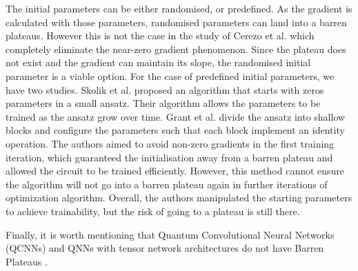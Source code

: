 The initial parameters can be either randomised, or predefined.
As the gradient is calculated with those parameters, randomised parameters can land into a barren plateaus.
However this is not the case in the study of Cerezo et al. which completely eliminate the near-zero gradient phenomenon.
Since the plateau does not exist and the gradient can maintain its slope, the randomised initial parameter is a viable option.
For the case of predefined initial parameters, we have two studies.
Skolik et al. \cite{skolikLayerwiseLearningQuantum2021} proposed an algorithm that starts with zeros parameters in a small ansatz.
Their algorithm allows the parameters to be trained as the ansatz grow over time.
Grant et al. \cite{grantInitializationStrategyAddressing2019} divide the ansatz into shallow blocks and configure the parameters such that each block implement an identity operation.
The authors aimed to avoid non-zero gradients in the first training iteration, which guaranteed the initialisation away from a barren plateau and allowed the circuit to be trained efficiently.
However, this method cannot ensure the algorithm will not go into a barren plateau again in further iterations of optimization algorithm.
Overall, the authors manipulated the starting parameters to achieve trainability, but the risk of going to a plateau is still there.

Finally, it is worth mentioning that Quantum Convolutional Neural Networks (QCNNs) and QNNs with tensor network architectures do not have Barren Plateaus \cite{congQuantumConvolutionalNeural2019}.


